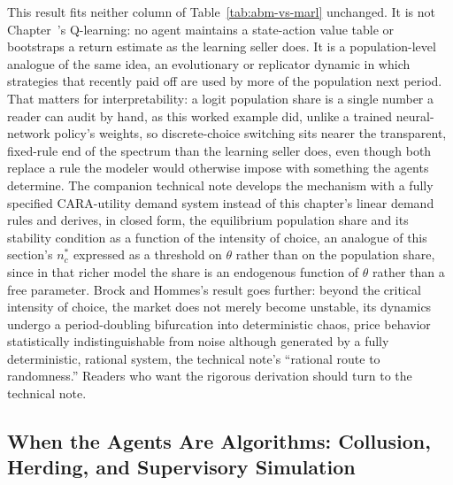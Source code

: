 \documentclass[../ai_in_finance]{subfiles}
\begin{document}
This result fits neither column of Table~\ref{tab:abm-vs-marl} unchanged. It is not Chapter~'s Q-learning: no agent maintains a state-action value table or bootstraps a return estimate as the learning seller does. It is a population-level analogue of the same idea, an evolutionary or replicator dynamic in which strategies that recently paid off are used by more of the population next period. That matters for interpretability: a logit population share is a single number a reader can audit by hand, as this worked example did, unlike a trained neural-network policy's weights, so discrete-choice switching sits nearer the transparent, fixed-rule end of the spectrum than the learning seller does, even though both replace a rule the modeler would otherwise impose with something the agents determine. The companion technical note develops the mechanism with a fully specified CARA-utility demand system instead of this chapter's linear demand rules and derives, in closed form, the equilibrium population share and its stability condition as a function of the intensity of choice, an analogue of this section's $n_c^{*}$ expressed as a threshold on $\theta$ rather than on the population share, since in that richer model the share is an endogenous function of $\theta$ rather than a free parameter. Brock and Hommes's result goes further: beyond the critical intensity of choice, the market does not merely become unstable, its dynamics undergo a period-doubling bifurcation into deterministic chaos, price behavior statistically indistinguishable from noise although generated by a fully deterministic, rational system, the technical note's ``rational route to randomness.'' Readers who want the rigorous derivation should turn to the technical note.

\subsection{When the Agents Are Algorithms: Collusion, Herding, and Supervisory Simulation}
\label{sec:abm-ai-agents}
\end{document}
